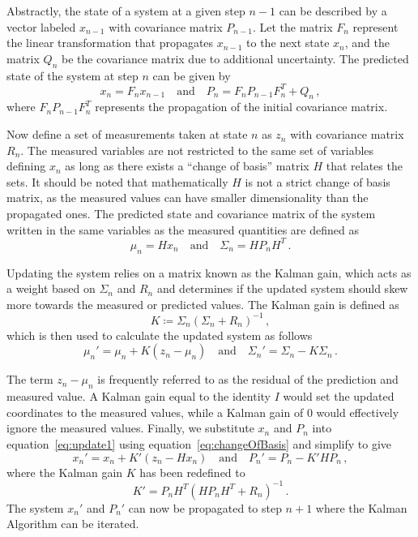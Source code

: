Abstractly, the state of a system at a given step $n-1$ can be described by a vector labeled $x_{n-1}$ with covariance matrix $P_{n-1}$. Let the matrix $F_n$ represent the linear transformation that propagates $x_{n-1}$ to the next state $x_{n}$, and the matrix $Q_{n}$ be the covariance matrix due to additional uncertainty. The predicted state of the system at step $n$ can be given by
\begin{equation}
	\label{eq:prop}
	x_{n}=F_{n}x_{n-1} \quad \textrm{and} \quad P_{n}=F_nP_{n-1}F_n^T+Q_n\,,
\end{equation}
where $F_nP_{n-1}F_n^T$ represents the propagation of the initial covariance matrix.

Now define a set of measurements taken at state $n$ as $z_n$ with covariance matrix $R_n$. The measured variables are not restricted to the same set of variables defining $x_n$ as long as there exists a ``change of basis'' matrix $H$ that relates the sets. It should be noted that mathematically $H$ is not a strict change of basis matrix, as the measured values can have smaller dimensionality than the propagated ones. The predicted state and covariance matrix of the system written in the same variables as the measured quantities are defined as
\begin{equation}
	\label{eq:changeOfBasis}
	\mu_n=Hx_n \quad \textrm{and} \quad \Sigma_n=HP_nH^{T}\,.
\end{equation}

Updating the system relies on a matrix known as the Kalman gain, which acts as a weight based on $\Sigma_n$ and $R_n$ and determines if the updated system should skew more towards the measured or predicted values. The Kalman gain is defined as
\begin{equation}
	\label{eq:gain}
	K\coloneqq \Sigma_n\left(\Sigma_n+R_n\right)^{-1}\,,
\end{equation}
which is then used to calculate the updated system as follows
\begin{equation}
	\label{eq:update1}
	\mu_n'=\mu_n+K\left(z_n-\mu_n\right) \quad \textrm{and} \quad \Sigma_n'=\Sigma_n-K\Sigma_n\,.
\end{equation}

The term $z_n-\mu_n$ is frequently referred to as the residual of the prediction and measured value. A Kalman gain equal to the identity $I$ would set the updated coordinates to the measured values, while a Kalman gain of $0$ would effectively ignore the measured values. Finally, we substitute $x_n$ and $P_n$ into equation~\ref{eq:update1} using equation~\ref{eq:changeOfBasis} and simplify to give
\begin{equation}
	x_n'=x_n+K'(z_n-Hx_n) \quad \mathrm{and} \quad P_n'= P_n-K'HP_n\,,
\end{equation}
where the Kalman gain $K$ has been redefined to
\begin{equation} \label{eq:gain2}
	K'=P_nH^T(HP_nH^T+R_n)^{-1}\,.
\end{equation}
The system $x_n'$ and $P_n'$ can now be propagated to step $n+1$ where the Kalman Algorithm can be iterated.

